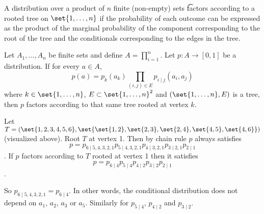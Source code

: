 A distribution over a product of $n$ finite (non-empty) sets \t{factors according to a rooted tree} on $\set{1, \dots, n}$ if the probability of each outcome can be expressed as the product of the marginal probability of the component corresponding to the root of the tree and the conditionals corresponding to the edges in the tree.


Let $A_1, \dots, A_n$ be finite sets and define $A = \prod_{i = 1}^{n}$.
Let $p: A \to [0, 1]$ be a distribution.
If for every $a \in A$, $$p(a) = p_k(a_k)\prod_{(i, j) \in E} p_{i \mid j}(a_i, a_j)$$ where $k \in \set{1, \dots, n}$, $E \subset \set{1, \dots, n}^2$ and $(\set{1, \dots, n}, E)$ is a tree, then $p$ factors according to that same tree rooted at vertex $k$.



Let $T = (\set{1, 2, 3, 4, 5, 6}, \set{\set{1, 2}, \set{2, 3}, \set{2, 4}, \set{4, 5}, \set{4, 6}})$ (visualized above). Root $T$ at vertex 1.
Then by chain rule $p$ always satisfies $$p = p_{6 \mid 5, 4, 3, 2, 1}p_{5 \mid 4, 3, 2, 1}p_{4 \mid 3, 2, 1} p_{3 \mid 2, 1}p_{2 \mid 1}$$.
If $p$ factors according to $T$ rooted at vertex 1 then it satisfies $$p = p_{6 \mid 4}p_{5 \mid 4}p_{4 \mid 2}p_{3 \mid 2}p_{2 \mid 1}$$.

So $p_{6 \mid 5, 4, 3, 2, 1} = p_{6 \mid 4}$. In other words, the conditional distribution does not depend on $a_1$, $a_2$, $a_3$ or $a_5$. Similarly for $p_{5 \mid 4}$, $p_{4 \mid 2}$ and $p_{3 \mid 2}$.

\strats
